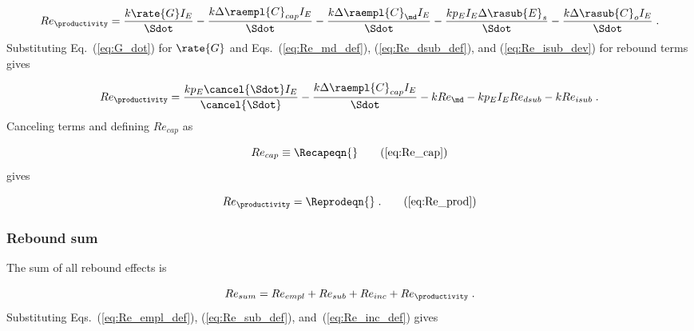 \begin{equation}
  Re_{\productivity} = \frac{k \rate{G} I_E}{\Sdot}
                                - \frac{k \Delta \raempl{C}_{cap} I_E}{\Sdot}
                                - \frac{k \Delta \raempl{C}_{\md} I_E}{\Sdot}
                                - \frac{k p_E I_E \Delta \rasub{E}_s}{\Sdot}
                                - \frac{k \Delta \rasub{C}_o I_E}{\Sdot} \; .
\end{equation}
%
Substituting Eq.~(\ref{eq:G_dot}) for $\rate{G}$
and Eqs.~(\ref{eq:Re_md_def}), (\ref{eq:Re_dsub_def}), and (\ref{eq:Re_isub_dev})
for rebound terms gives

\begin{equation}
  Re_{\productivity} = \frac{k p_E \cancel{\Sdot} I_E}{\cancel{\Sdot}}
                                - \frac{k \Delta \raempl{C}_{cap} I_E}{\Sdot}
                                - k Re_{\md}
                                - k p_E I_E Re_{dsub}
                                - k Re_{isub} \; .
\end{equation}
%
Canceling terms and defining $Re_{cap}$ as

\begin{equation}
  Re_{cap} \equiv \Recapeqn{}  \tag{\ref{eq:Re_cap}}
\end{equation}
%
gives

% 

\begin{equation}
  Re_{\productivity} = \Reprodeqn{} \; . \tag{\ref{eq:Re_prod}}
\end{equation}


\subsubsection{Rebound sum} 
\label{sec:total_rebound}

The sum of all rebound effects is 

\begin{equation}
  Re_{sum} = Re_{empl} + Re_{sub} + Re_{inc} + Re_{\productivity} \; .
\end{equation}
%
Substituting Eqs.~(\ref{eq:Re_empl_def}), (\ref{eq:Re_sub_def}), and~(\ref{eq:Re_inc_def}) gives

